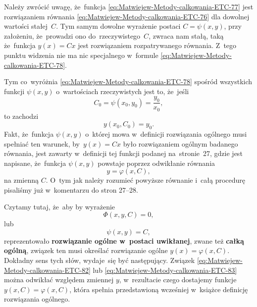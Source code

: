 \documentclass[a4paper,11pt]{article}
\numberwithin{equation}{section}
\begin{document}
Należy zwrócić uwagę, że~funkcja
\eqref{eq:Matwiejew-Metody-calkowania-ETC-77} jest rozwiązaniem równania
\eqref{eq:Matwiejew-Metody-calkowania-ETC-76} dla dowolnej wartości
stałej~$C$. Tym samym dowolne wyrażenie postaci $C = \psi( x, y )$, przy
założeniu, że~prowadzi ono do~rzeczywistego~$C$, zwraca nam stałą, taką
że~funkcja $y( x ) = C x$ jest rozwiązaniem rozpatrywanego równania. Z~tego
punktu widzenia nie ma nic specjalnego w~formule
\eqref{eq:Matwiejew-Metody-calkowania-ETC-78}.

Tym co~wyróżnia \eqref{eq:Matwiejew-Metody-calkowania-ETC-78} spośród
wszystkich funkcji $\psi( x, y )$ o~wartościach rzeczywistych jest to,
że~jeśli
\begin{equation}
  \label{eq:Uwagi-do-konkrentych-stron-60}
  C_{ 0 } = \psi( x_{ 0 }, y_{ 0 } ) = \frac{ y_{ 0 } }{ x_{ 0 } },
\end{equation}
to zachodzi
\begin{equation}
  \label{eq:Uwagi-do-konkrentych-stron-61}
  y( x_{ 0 }, C_{ 0 } ) = y_{ 0 }.
\end{equation}
Fakt, że~funkcja $\psi( x, y )$ o~której mowa w~definicji rozwiązania ogólnego
musi spełniać ten warunek, by~$y( x ) = C x$ było rozwiązaniem ogólnym
badanego równania, jest zawarty w~definicji tej funkcji podanej
na~stronie~27, gdzie jest napisane, że~funkcja $\psi( x, y )$ powstaje
poprzez odwikłanie równania
\begin{equation}
  \label{eq:Uwagi-do-konkrentych-stron-62}
  y = \varphi( x, C ),
\end{equation}
na zmienną $C$. O~tym jak należy rozumieć powyższe równanie i~całą procedurę
pisaliśmy już w~komentarzu do stron 27--28.

\VerSpaceFour





\noindent
Czytamy tutaj, że~aby by wyrażenie
\begin{equation}
  \label{eq:Uwagi-do-konkrentych-stron-63}
  \Phi( x, y, C ) = 0,
\end{equation}
lub
\begin{equation}
  \label{eq:Uwagi-do-konkrentych-stron-64}
  \psi( x, y ) = C,
\end{equation}
reprezentowało \textbf{rozwiązanie ogólne w~postaci uwikłanej}, zwane też
\textbf{całką ogólną}, związek ten musi określać rozwiązanie ogólne
$y( x ) = \varphi( x, C )$. Dokładny sens tych słów, wydaje~się być następujący.
Związek \eqref{eq:Matwiejew-Metody-calkowania-ETC-82} lub
\eqref{eq:Matwiejew-Metody-calkowania-ETC-83} można odwikłać względem
zmiennej $y$, w~rezultacie czego dostajemy funkcje $y( x, C ) = \varphi( x, C )$,
która spełnia przedstawioną wcześniej w~książce definicję rozwiązania
ogólnego.
\end{document}
